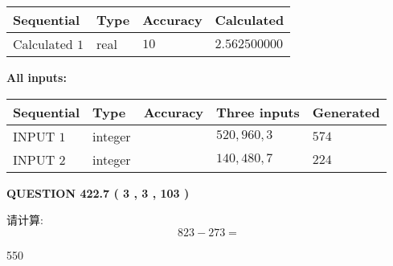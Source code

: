 \documentclass{ctexart}
\begin{document}
   
   
   
\noindent{}
   
   
  
  
\noindent\begin{tabular}{|l|l|l|l|}
\hline
 Sequential & Type & Accuracy & Calculated \\ 
\hline
 
 
  Calculated $  1 $ & real & $  10  $ & 
 $ 2.562500000 $ 
 \\  \hline  
 \end{tabular}
   
   
   
   
\noindent\vspace{0.1in}\hspace{-0.08in} {\textbf{\Large{All inputs: }}}
   
   
  
  
\noindent\begin{tabular}{|l|l|l|l|l|}
\hline
 Sequential & Type & Accuracy & Three inputs & Generated \\ 
\hline
 
 
  INPUT $  1 $ & integer &  & $
 520
 , 
 960
 , 
 3
 $ & $ 574 $ 
 \\  \hline  
 
 
  INPUT $  2 $ & integer &  & $
 140
 , 
 480
 , 
 7
 $ & $ 224 $ 
 \\  \hline  
 \end{tabular}
   
   
  
\vspace{0.2in}
  
{\textbf{\Large{QUESTION
422.7 
 ( 3 , 3 , 103 )
}}}
  
  
 
请计算:
\begin{equation}
823 -   %
273 = \nonumber
\end{equation}
 
 
 
\noindent{}
 
 

550
 
 
\noindent{}
 
 

 
 
 
\noindent{}
 
\end{document}
